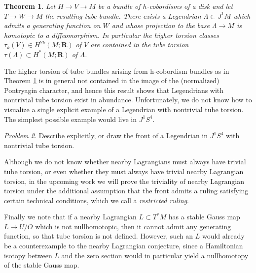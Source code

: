 \documentclass{amsart}
\def\bR{\mathbf{R}}
\newtheorem{theorem}{Theorem}[section]
\theoremstyle{definition}
\theoremstyle{remark}
\newtheorem{problem}[theorem]{Problem}
\newtheorem{inductive lemma}[theorem]{Inductive Lemma}
\begin{document}
\begin{theorem}\label{thm: existence of example} 
Let $H \to V \to M$ be a bundle of $h$-cobordisms of a disk and let $T \to W \to M$ the resulting tube bundle. There exists a Legendrian $\Lambda \subset J^1M$ which admits a generating function on $W$ and whose projection to the base $\Lambda \to M$ is homotopic to a diffeomorphism. In particular the higher torsion classes $\tau_k(V) \in H^{2k}(M;\bR)$ of $V$ are contained in the tube torsion $\tau(\Lambda) \subset H^*(M;\bR)$ of $\Lambda$.
\end{theorem}

The higher torsion of tube bundles arising from h-cobordism bundles as in Theorem \ref{thm: existence of example} is in general not contained in the image of the (normalized) Pontryagin character, and hence this result shows that Legendrians with nontrivial tube torsion exist in abundance. Unfortunately, we do not know how to visualize a single explicit example of a Legendrian with nontrivial tube torsion. The simplest possible example would live in $J^1S^4$.

 \begin{problem}\label{pros: exhibit}
Describe explicitly, or draw the front of a Legendrian in $J^1S^4$ with nontrivial tube torsion.
\end{problem}

Although we do not know whether nearby Lagrangians must always have trivial tube torsion, or even whether they must always have trivial nearby Lagrangian torsion, in the upcoming work \cite{AIS} we will prove the triviality of nearby Lagrangian torsion under the additional assumption that the front admits a ruling satisfying certain technical conditions, which we call a {\em restricted ruling}.

Finally we note that if a nearby Lagrangian $L \subset T^*M$ has a stable Gauss map $L \to U/O$ which is not nullhomotopic, then it cannot admit any generating function, so that tube torsion is not defined. However, such an $L$ would already be a counterexample to the nearby Lagrangian conjecture, since a Hamiltonian isotopy between $L$ and the zero section would in particular yield a nullhomotopy of the stable Gauss map. 
\end{document}
